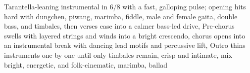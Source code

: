 

\begin{notes}
\end{notes}

\begin{style}
Tarantella-leaning instrumental in 6/8 with a fast, galloping pulse; opening hits hard with dungchen, piwang, marimba, fiddle, male and female gaita, double bass, and timbales, then verses ease into a calmer bass-led drive, Pre-chorus swells with layered strings and winds into a bright crescendo, chorus opens into an instrumental break with dancing lead motifs and percussive lift, Outro thins instruments one by one until only timbales remain, crisp and intimate, mix bright, energetic, and folk-cinematic, marimba, ballad
\end{style}

